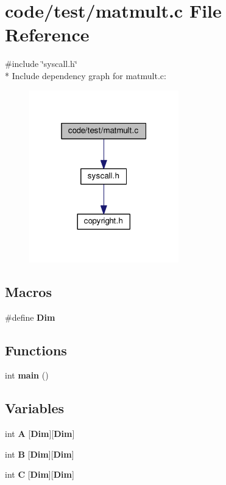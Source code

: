 \section{code/test/matmult.c File Reference}
\label{matmult_8c}
{\ttfamily \#include \char`\"{}syscall.\+h\char`\"{}}\\*
Include dependency graph for matmult.\+c\+:
\nopagebreak
\begin{figure}[H]
\begin{center}
\leavevmode
\includegraphics[width=184pt]{matmult_8c__incl}
\end{center}
\end{figure}
\subsection*{Macros}
\begin{DoxyCompactItemize}
\item 
\#define {\bf Dim}
\end{DoxyCompactItemize}
\subsection*{Functions}
\begin{DoxyCompactItemize}
\item 
int {\bf main} ()
\end{DoxyCompactItemize}
\subsection*{Variables}
\begin{DoxyCompactItemize}
\item 
int {\bf A} [{\bf Dim}][{\bf Dim}]
\item 
int {\bf B} [{\bf Dim}][{\bf Dim}]
\item 
int {\bf C} [{\bf Dim}][{\bf Dim}]
\end{DoxyCompactItemize}



